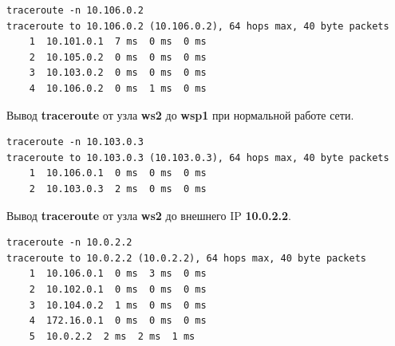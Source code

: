 \documentclass[a4paper,12pt]{article}
\begin{document}
\begin{Verbatim}
traceroute -n 10.106.0.2 
traceroute to 10.106.0.2 (10.106.0.2), 64 hops max, 40 byte packets
    1  10.101.0.1  7 ms  0 ms  0 ms
    2  10.105.0.2  0 ms  0 ms  0 ms
    3  10.103.0.2  0 ms  0 ms  0 ms
    4  10.106.0.2  0 ms  1 ms  0 ms    
\end{Verbatim}

Вывод \textbf{traceroute} от узла \textbf{ws2} до \textbf{wsp1} при нормальной работе сети.

\begin{Verbatim}
traceroute -n 10.103.0.3
traceroute to 10.103.0.3 (10.103.0.3), 64 hops max, 40 byte packets
    1  10.106.0.1  0 ms  0 ms  0 ms
    2  10.103.0.3  2 ms  0 ms  0 ms    
\end{Verbatim}

Вывод \textbf{traceroute} от узла \textbf{ws2} до внешнего IP \textbf{10.0.2.2}.

\begin{Verbatim}
traceroute -n 10.0.2.2
traceroute to 10.0.2.2 (10.0.2.2), 64 hops max, 40 byte packets
	1  10.106.0.1  0 ms  3 ms  0 ms
	2  10.102.0.1  0 ms  0 ms  0 ms
	3  10.104.0.2  1 ms  0 ms  0 ms
	4  172.16.0.1  0 ms  0 ms  0 ms
	5  10.0.2.2  2 ms  2 ms  1 ms	
\end{Verbatim}
\end{document}
